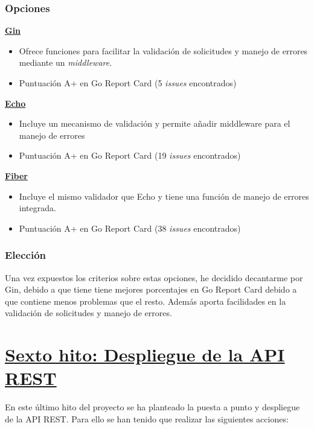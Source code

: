 \subsubsection{Opciones}

\textbf{\href{https://pkg.go.dev/github.com/gin-gonic/gin}{Gin}}

\begin{itemize}
\item
  Ofrece funciones para facilitar la validación de solicitudes y manejo de errores mediante un \textit{middleware}.
\item
  Puntuación A+ en Go Report Card (5 \textit{issues} encontrados)
\end{itemize}

\textbf{\href{https://pkg.go.dev/github.com/labstack/echo/v4}{Echo}}

\begin{itemize}
\item
  Incluye un mecanismo de validación y permite añadir middleware para el manejo de errores
\item
Puntuación A+ en Go Report Card (19 \textit{issues} encontrados)
\end{itemize}

\textbf{\href{https://pkg.go.dev/github.com/gofiber/fiber/v2}{Fiber}}

\begin{itemize}
\item
  Incluye el mismo validador que Echo y tiene una función de manejo de errores integrada.
\item
Puntuación A+ en Go Report Card (38 \textit{issues} encontrados)
\end{itemize}

\subsubsection{Elección}

Una vez expuestos los criterios sobre estas opciones, he decidido decantarme por Gin, debido a que tiene tiene mejores porcentajes en Go Report Card debido a que contiene menos problemas que el resto.
Además aporta facilidades en la validación de solicitudes y manejo de errores.

\newpage

\section{\href{https://github.com/manujurado1/SportsBar-IV/tree/PMV-Despliegue_API}{Sexto hito: Despliegue de la API REST}}
En este último hito del proyecto se ha planteado la puesta a punto y despliegue de la API REST. Para ello se han tenido que realizar las siguientes acciones:

